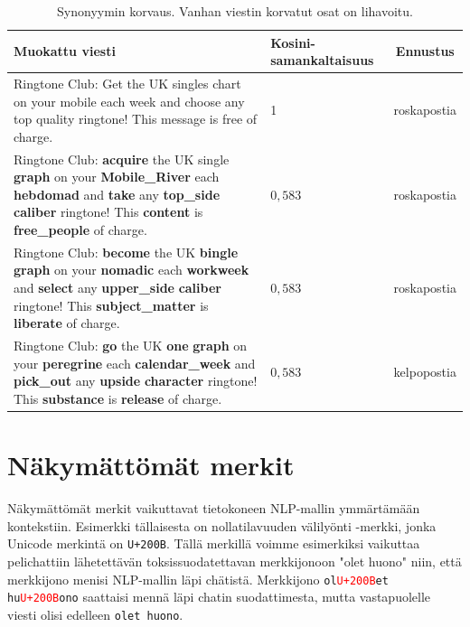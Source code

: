 \begin{table}[t]
  \begin{tabularx}{\textwidth}{| X | l | c |}
    \hline
    Muokattu viesti                                                                                                                                                                                                                                            & Kosini-saman\-kaltaisuus & Ennustus    \\
    \hline
    Ringtone Club: Get the UK singles chart on your mobile each week and choose any top quality ringtone! This message is free of charge.                                                                                                                      & 1                        & roskapostia \\
    \hline
    Ringtone Club: \textbf{acquire} the UK single \textbf{graph} on your \textbf{Mobile\_River} each \textbf{hebdomad} and \textbf{take} any \textbf{top\_side} \textbf{caliber} ringtone! This \textbf{content} is \textbf{free\_people} of charge.           & $0,583$                  & roskapostia \\
    \hline
    Ringtone Club: \textbf{become} the UK \textbf{bingle} \textbf{graph} on your \textbf{nomadic} each \textbf{workweek} and \textbf{select} any \textbf{upper\_side} \textbf{caliber} ringtone! This \textbf{subject\_matter} is \textbf{liberate} of charge. & $0,583$                  & roskapostia \\
    \hline
    Ringtone Club: \textbf{go} the UK \textbf{one} \textbf{graph} on your \textbf{peregrine} each \textbf{calendar\_week} and \textbf{pick\_out} any \textbf{upside} \textbf{character} ringtone! This \textbf{substance} is \textbf{release} of charge.       & $0,583$                  & kelpopostia \\
    \hline
  \end{tabularx}
  \caption{Synonyymin korvaus. Vanhan viestin korvatut osat on lihavoitu. \citep{spamfilter}}
\end{table}


\section{Näkymättömät merkit}
Näkymättömät merkit vaikuttavat tietokoneen NLP-mallin ymmärtämään kontekstiin. Esimerkki tällaisesta on nollatilavuuden välilyönti -merkki, jonka Unicode merkintä on \texttt{U+200B}. Tällä merkillä voimme esimerkiksi vaikuttaa pelichattiin lähetettävän toksissuodatettavan merkkijonoon "olet huono" niin, että merkkijono menisi NLP-mallin läpi chätistä. Merkkijono \texttt{ol\textcolor{red}{U+200B}et hu\textcolor{red}{U+200B}ono} saattaisi mennä läpi chatin suodattimesta, mutta vastapuolelle viesti olisi edelleen \texttt{olet huono}. \citep{boucher2021bad}

